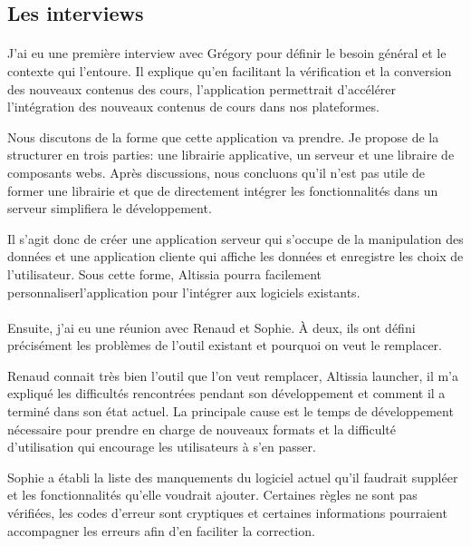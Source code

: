 \subsection{Les interviews}
\label{subsec:interviews}

\paragraph{}
J'ai eu une première interview avec Grégory pour définir le besoin général et le contexte qui l'entoure.
Il explique qu'en facilitant la vérification et la conversion des nouveaux contenus des cours, l'application permettrait d'accélérer l'intégration des nouveaux contenus de cours dans nos plateformes.

Nous discutons de la forme que cette application va prendre. 
Je propose de la structurer en trois parties: une librairie applicative, un serveur et une libraire de composants webs.
Après discussions, nous concluons qu'il n'est pas utile de former une librairie et que de directement intégrer les fonctionnalités dans un serveur simplifiera le développement.

Il s'agit donc de créer une application serveur qui s'occupe de la manipulation des données et une application cliente qui affiche les données et enregistre les choix de l'utilisateur.
Sous cette forme, Altissia pourra facilement personnaliser\fnmark l'application pour l'intégrer aux logiciels existants.

\paragraph{}
Ensuite, j'ai eu une réunion avec Renaud et Sophie.
À deux, ils ont défini précisément les problèmes de l'outil existant et pourquoi on veut le remplacer.

Renaud connait très bien l'outil que l'on veut remplacer, Altissia launcher, il m'a expliqué les difficultés rencontrées pendant son développement et comment il a terminé dans son état actuel.
La principale cause est le temps de développement nécessaire pour prendre en charge de nouveaux formats et la difficulté d'utilisation qui encourage les utilisateurs à s'en passer.

Sophie a établi la liste des manquements du logiciel actuel qu'il faudrait suppléer et les fonctionnalités qu'elle voudrait ajouter.
Certaines règles ne sont pas vérifiées, les codes d'erreur sont cryptiques et certaines informations pourraient accompagner les erreurs afin d'en faciliter la correction.

